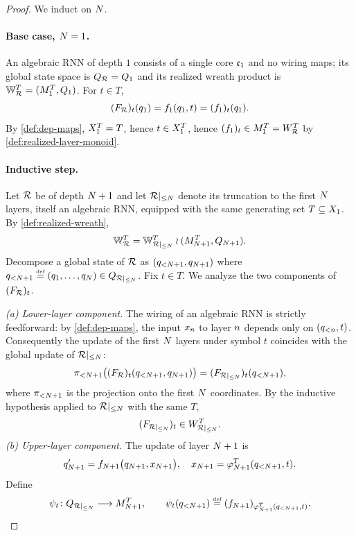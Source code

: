 \documentclass{article}
\begin{document}
\begin{proof}
We induct on $N$.

\paragraph{Base case, $N = 1$.}
An algebraic RNN of depth $1$ consists of a single core $\mathfrak{c}_1$ and no wiring maps; its global state space is $Q_{\mathcal{R}} = Q_1$ and its realized wreath product is $\mathbb{W}_{\mathcal{R}}^T = (M_1^T, Q_1)$. For $t \in T$,
$$
(F_{\mathcal{R}})_t(q_1) = f_1(q_1, t) = (f_1)_t(q_1).
$$
By \cref{def:dep-maps}, $X_1^T = T$, hence $t \in X_1^T$, hence $(f_1)_t \in M_1^T = W_{\mathcal{R}}^T$ by \cref{def:realized-layer-monoid}.

\paragraph{Inductive step.}
Let $\mathcal{R}$ be of depth $N+1$ and let $\mathcal{R}|_{\leq N}$ denote its truncation to the first $N$ layers, itself an algebraic RNN, equipped with the same generating set $T \subseteq X_1$. By \cref{def:realized-wreath},
$$
\mathbb{W}_{\mathcal{R}}^T = \mathbb{W}_{\mathcal{R}|_{\leq N}}^T \wr (M_{N+1}^T, Q_{N+1}).
$$
Decompose a global state of $\mathcal{R}$ as $(q_{<N+1}, q_{N+1})$ where $q_{<N+1} \mathrel{\stackrel{\textnormal{\tiny def}}{=}} (q_1, \ldots, q_N) \in Q_{\mathcal{R}|_{\leq N}}$.
Fix $t \in T$. We analyze the two components of $(F_{\mathcal{R}})_t$.

\smallskip
\emph{(a) Lower-layer component.} The wiring of an algebraic RNN is strictly feedforward: by \cref{def:dep-maps}, the input $x_n$ to layer $n$ depends only on $(q_{<n}, t)$. 
Consequently the update of the first $N$ layers under symbol $t$ coincides with the global update of $\mathcal{R}|_{\leq N}$:
$$
\pi_{<N+1}\bigl((F_{\mathcal{R}})_t(q_{<N+1}, q_{N+1})\bigr) = (F_{\mathcal{R}|_{\leq N}})_t(q_{<N+1}),
$$
where $\pi_{<N+1}$ is the projection onto the first $N$ coordinates. By the inductive hypothesis applied to $\mathcal{R}|_{\leq N}$ with the same $T$,
$$
(F_{\mathcal{R}|_{\leq N}})_t \in W_{\mathcal{R}|_{\leq N}}^T.
$$
\smallskip
\emph{(b) Upper-layer component.} The update of layer $N+1$ is
$$
q_{N+1}' = f_{N+1}\bigl(q_{N+1}, x_{N+1}\bigr), \quad x_{N+1} = \varphi_{N+1}^T(q_{<N+1}, t).
$$
Define
$$
\psi_t \colon Q_{\mathcal{R}|_{\leq N}} \longrightarrow M_{N+1}^T, \qquad
\psi_t(q_{<N+1}) \mathrel{\stackrel{\textnormal{\tiny def}}{=}} (f_{N+1})_{\varphi_{N+1}^T(q_{<N+1}, t)}.
$$


\end{proof}
\end{document}

